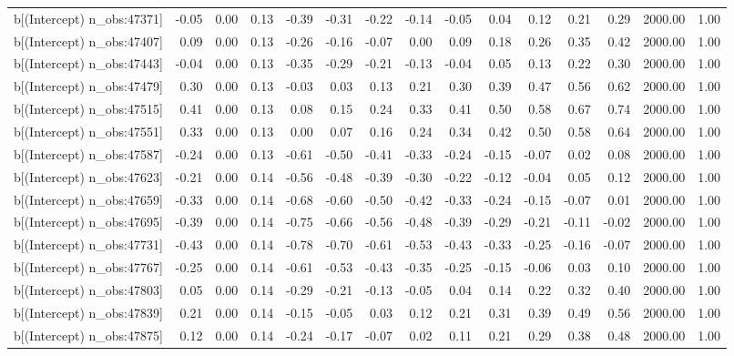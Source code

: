 \begin{table}[ht]
\begin{tabular}{rrrrrrrrrrrrrrr}
  b[(Intercept) n\_obs:47371] & -0.05 & 0.00 & 0.13 & -0.39 & -0.31 & -0.22 & -0.14 & -0.05 & 0.04 & 0.12 & 0.21 & 0.29 & 2000.00 & 1.00 \\ 
  b[(Intercept) n\_obs:47407] & 0.09 & 0.00 & 0.13 & -0.26 & -0.16 & -0.07 & 0.00 & 0.09 & 0.18 & 0.26 & 0.35 & 0.42 & 2000.00 & 1.00 \\ 
  b[(Intercept) n\_obs:47443] & -0.04 & 0.00 & 0.13 & -0.35 & -0.29 & -0.21 & -0.13 & -0.04 & 0.05 & 0.13 & 0.22 & 0.30 & 2000.00 & 1.00 \\ 
  b[(Intercept) n\_obs:47479] & 0.30 & 0.00 & 0.13 & -0.03 & 0.03 & 0.13 & 0.21 & 0.30 & 0.39 & 0.47 & 0.56 & 0.62 & 2000.00 & 1.00 \\ 
  b[(Intercept) n\_obs:47515] & 0.41 & 0.00 & 0.13 & 0.08 & 0.15 & 0.24 & 0.33 & 0.41 & 0.50 & 0.58 & 0.67 & 0.74 & 2000.00 & 1.00 \\ 
  b[(Intercept) n\_obs:47551] & 0.33 & 0.00 & 0.13 & 0.00 & 0.07 & 0.16 & 0.24 & 0.34 & 0.42 & 0.50 & 0.58 & 0.64 & 2000.00 & 1.00 \\ 
  b[(Intercept) n\_obs:47587] & -0.24 & 0.00 & 0.13 & -0.61 & -0.50 & -0.41 & -0.33 & -0.24 & -0.15 & -0.07 & 0.02 & 0.08 & 2000.00 & 1.00 \\ 
  b[(Intercept) n\_obs:47623] & -0.21 & 0.00 & 0.14 & -0.56 & -0.48 & -0.39 & -0.30 & -0.22 & -0.12 & -0.04 & 0.05 & 0.12 & 2000.00 & 1.00 \\ 
  b[(Intercept) n\_obs:47659] & -0.33 & 0.00 & 0.14 & -0.68 & -0.60 & -0.50 & -0.42 & -0.33 & -0.24 & -0.15 & -0.07 & 0.01 & 2000.00 & 1.00 \\ 
  b[(Intercept) n\_obs:47695] & -0.39 & 0.00 & 0.14 & -0.75 & -0.66 & -0.56 & -0.48 & -0.39 & -0.29 & -0.21 & -0.11 & -0.02 & 2000.00 & 1.00 \\ 
  b[(Intercept) n\_obs:47731] & -0.43 & 0.00 & 0.14 & -0.78 & -0.70 & -0.61 & -0.53 & -0.43 & -0.33 & -0.25 & -0.16 & -0.07 & 2000.00 & 1.00 \\ 
  b[(Intercept) n\_obs:47767] & -0.25 & 0.00 & 0.14 & -0.61 & -0.53 & -0.43 & -0.35 & -0.25 & -0.15 & -0.06 & 0.03 & 0.10 & 2000.00 & 1.00 \\ 
  b[(Intercept) n\_obs:47803] & 0.05 & 0.00 & 0.14 & -0.29 & -0.21 & -0.13 & -0.05 & 0.04 & 0.14 & 0.22 & 0.32 & 0.40 & 2000.00 & 1.00 \\ 
  b[(Intercept) n\_obs:47839] & 0.21 & 0.00 & 0.14 & -0.15 & -0.05 & 0.03 & 0.12 & 0.21 & 0.31 & 0.39 & 0.49 & 0.56 & 2000.00 & 1.00 \\ 
  b[(Intercept) n\_obs:47875] & 0.12 & 0.00 & 0.14 & -0.24 & -0.17 & -0.07 & 0.02 & 0.11 & 0.21 & 0.29 & 0.38 & 0.48 & 2000.00 & 1.00 \\ 

\end{tabular}
\end{table}
